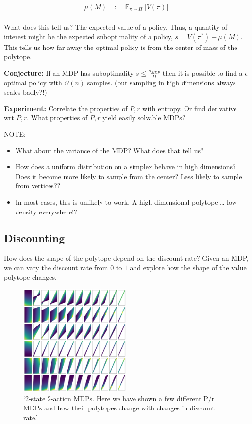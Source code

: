 \begin{align*}
\mu(M) &:= \mathop{\mathbb E}_{\pi\sim\Pi}\Big[V(\pi) \Big]\\
\end{align*}

What does this tell us? The expected value of a policy. Thus, a quantity
of interest might be the expected suboptimality of a policy,
\(s = V(\pi^{* })-\mu(M)\). This tells us how far away the optimal
policy is from the center of mass of the polytope.

\textbf{Conjecture:} If an MDP has suboptimality
\(s \le \frac{\sigma_{MDP}}{D}\) then it is possible to find a
\(\epsilon\) optimal policy with \(\mathcal O(n)\) samples. (but
sampling in high dimensions always scales badly?!)

\textbf{Experiment:} Correlate the properties of \(P, r\) with entropy.
Or find derivative wrt \(P, r\). What properties of \(P, r\) yield
easily solvable MDPs?

NOTE:

\begin{itemize}
\item
  What about the variance of the MDP? What does that tell us?
\item
  How does a uniform distribution on a simplex behave in high
  dimensions? Does it become more likely to sample from the center? Less
  likely to sample from vertices??
\item
  In most cases, this is unlikely to work. A high dimensional polytope
  \ldots{} low density everywhere!?
\end{itemize}


\subsection{Discounting}

How does the shape of the polytope depend on the discount rate? Given an
MDP, we can vary the discount rate from \(0\) to \(1\) and explore how
the shape of the value polytope changes.

\begin{figure}
\centering
\includegraphics[width=0.5\textwidth,height=0.5\textheight]{../../pictures/figures/discounts.png}
\caption{`2-state 2-action MDPs. Here we have shown a few different P/r
MDPs and how their polytopes change with changes in discount rate.'}
\end{figure}

